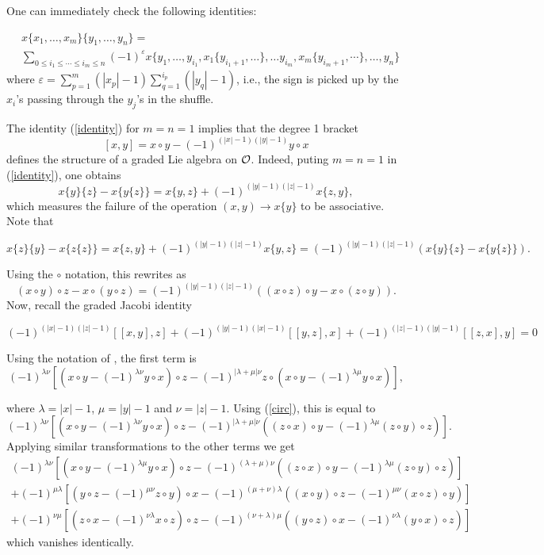\documentclass[TFM.tex]{subfiles}
\begin{document}
One can immediately check the following identities:

\begin{equation}\label{identity}
\begin{aligned}
&x\{x_1, \dots , x_m\}\{y_1, \dots , y_n\}=\\
&\sum_{0\leq i_1\leq\cdots\leq i_m\leq n}(-1)^\varepsilon x\{y_1,\dots, y_{i_1}, x_1\{y_{i_1+1},\dots\},\dots y_{i_m}, x_m\{y_{i_m+1},\cdots\},\dots, y_n\}
\end{aligned}
\end{equation}
where $\varepsilon =\sum^m_{p=1}(|x_p|-1)\sum^{i_p}_{q=1}(|y_q|-1)$, i.e., the sign is picked up by the $x_i$’s passing through the
$y_j$’s in the shuffle.


\begin{remark}
The identity (\ref{identity}) for $m=n=1$ implies that the degree 1 bracket
\[
[x,y]=x\circ y-(-1)^{(|x|-1)(|y|-1)}y\circ x
\]
defines the structure of a graded Lie algebra on ${\mathcal O}$. Indeed, puting $m = n = 1$ in (\ref{identity}), one obtains 
$$x\{y\}\{z\} − x\{y\{z\}\} = x\{y, z\} + (−1)^{(|y|-1)(|z|-1)}x\{z, y\},$$ %
which measures the failure of the operation $(x, y) → x\{y\}$ to be associative.  Note that

$$x\{z\}\{y\} − x\{z\{z\}\}=x\{z, y\} + (−1)^{(|y|-1)(|z|-1)}x\{y,z\}=(-1)^{(|y|-1)(|z|-1)}(x\{y\}\{z\} − x\{y\{z\}\}).$$

Using the $\circ$ notation, this rewrites as
\begin{equation}\label{circ}
(x\circ y)\circ z-x\circ(y\circ z)=(−1)^{(|y|-1)(|z|-1)}((x\circ z)\circ y- x\circ (z\circ y)).
\end{equation}
Now, recall the graded Jacobi identity 

$$(-1)^{(|x|-1)(|z|-1)}[[x,y],z]+(-1)^{(|y|-1)(|x|-1)}[[y,z],x]+(-1)^{(|z|-1)(|y|-1)}[[z,x],y]=0$$

Using the notation of \cite[Theorem 1]{Gerstenhaber}, the first term is 
\[
(-1)^{\lambda\nu}[(x\circ y -(-1)^{\lambda\nu}y\circ x)\circ z-(-1)^{|\lambda+\mu|\nu}z\circ(x\circ y-(-1)^{\lambda\mu}y\circ x)],
\]

where $\lambda=|x|-1$, $\mu=|y|-1$ and $\nu=|z|-1$. Using (\ref{circ}), this is equal to
\[
(-1)^{\lambda\nu}[(x\circ y -(-1)^{\lambda\nu}y\circ x)\circ z-(-1)^{|\lambda+\mu|\nu}((z\circ x)\circ y-(-1)^{\lambda\mu}(z\circ y)\circ z)].
\]
Applying similar transformations to the other terms we get
\begin{gather*}
(-1)^{\lambda\nu}[(x\circ y -(-1)^{\lambda\mu}y\circ x)\circ z-(-1)^{(\lambda+\mu)\nu}((z\circ x)\circ y-(-1)^{\lambda\mu}(z\circ y)\circ z)]\\
+(-1)^{\mu\lambda}[(y\circ z -(-1)^{\mu\nu}z\circ y)\circ x-(-1)^{(\mu+\nu)\lambda}((x\circ y)\circ z-(-1)^{\mu\nu}(x\circ z)\circ y)]\\
+(-1)^{\nu\mu}[(z\circ x -(-1)^{\nu\lambda}x\circ z)\circ z-(-1)^{(\nu+\lambda)\mu}((y\circ z)\circ x-(-1)^{\nu\lambda}(y\circ x)\circ z)]
\end{gather*}
which vanishes identically.
\end{remark}
\end{document}
